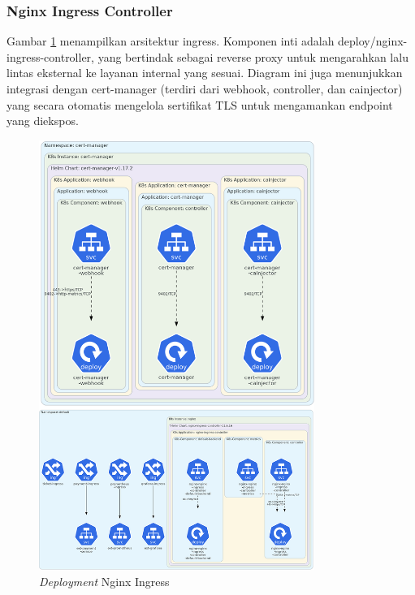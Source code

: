 \pagebreak

\subsubsection{Nginx Ingress Controller}

Gambar \ref{fig:deployment-nginx} menampilkan arsitektur ingress. Komponen inti adalah deploy/nginx-ingress-controller, yang bertindak sebagai reverse proxy untuk mengarahkan lalu lintas eksternal ke layanan internal yang sesuai. Diagram ini juga menunjukkan integrasi dengan cert-manager (terdiri dari webhook, controller, dan cainjector) yang secara otomatis mengelola sertifikat TLS untuk mengamankan endpoint yang diekspos.

\begin{figure}[H]
    \centering
    \includegraphics[width=0.8\textwidth]{resources/chapter-4/nginx-1.png}
    \caption{\textit{Deployment} Nginx Ingress}
    \label{fig:deployment-nginx}
\end{figure}

\pagebreak

